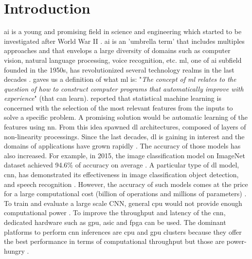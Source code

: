 \chapter{Introduction} \label{chap:intr}
%
\acrfull{ai} is a young and promising field in science and engineering which started to be investigated after World War II \cite{russell_artificial_2009}. \acrshort{ai} is an 'umbrella term' that includes multiples approaches and that envelops a large diversity of domains such as computer vision, natural language processing, voice recognition, etc.
\acrfull{ml}, one of \acrshort{ai} subfield founded in the 1950s, has revolutionized several technology realms in the last decades \cite{alom_history_2018}. \cite{mitchell_machine_1997} gaves us a definition of what \acrshort{ml} is: "\textit{The concept of \acrshort{ml} relates to the question of how to construct computer programs that automatically improve with experience}" (that can learn). \newline \newline
%
\cite{arnold_introduction_2011} reported that statistical machine learning is concerned with the selection of the most relevant features from the inputs to solve a specific problem. A promising solution would be automatic learning of the features using \acrfull{nn}. From this idea spawned \acrfull{dl} architectures, composed of layers of non-linearity processings. Since the last decades, \acrshort{dl} is gaining in interest and the domains of applications have grown rapidly \cite{wason_deep_2018}. The accuracy of those models has also increased. For example, in 2015, the image classification model on ImageNet dataset achieved 94.6\% of accuracy on average \cite{russakovsky_imagenet_2015}.\newline \newline
%
A particular type of \acrshort{dl} model, \acrfull{cnn}, has demonstrated its effectiveness in image classiﬁcation object detection, and speech recognition \cite{shawahna_fpga-based_2019}. However, the accuracy of such models comes at the price for a large computational cost (billion of operations and millions of parameters) \cite{szegedy_going_2014}. To train and evaluate a large scale CNN, general \acrfull{cpu} would not provide enough computational power \cite{liu_fpga-based_2019}. To improve the throughput and latency of the \acrshort{cnn}, dedicated hardware such as \acrfull{gpu}, \acrfull{asic} and \acrfull{fpga} can be used. The dominant platforms to perform \acrshort{cnn} inferences are \acrshort{cpu} and \acrshort{gpu} clusters because they offer the best performance in terms of computational throughput but those are power-hungry \cite{liu_uniform_2019}.
